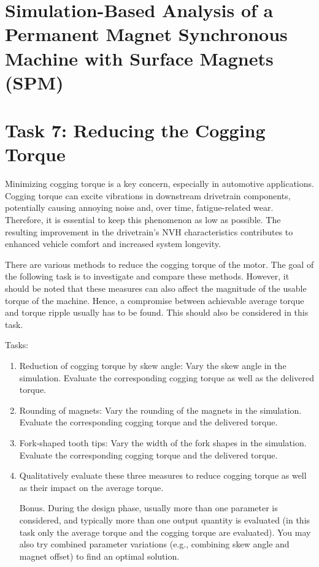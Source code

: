 %
%

\chapter*{Simulation-Based Analysis of a Permanent Magnet Synchronous Machine with Surface Magnets (SPM)}

\chapter{Task 7: Reducing the Cogging Torque}

Minimizing cogging torque is a key concern, especially in automotive applications. Cogging torque can excite vibrations in downstream drivetrain components, potentially causing annoying noise and, over time, fatigue-related wear. Therefore, it is essential to keep this phenomenon as low as possible. The resulting improvement in the drivetrain’s \gls{NVH} characteristics contributes to enhanced vehicle comfort and increased system longevity.

There are various methods to reduce the cogging torque of the motor. The goal of the following task is to investigate and compare these methods. However, it should be noted that these measures can also affect the magnitude of the usable torque of the machine. Hence, a compromise between achievable average torque and torque ripple usually has to be found. This should also be considered in this task.

\bigskip

Tasks:
\begin{enumerate}
	\item Reduction of cogging torque by skew angle: Vary the skew angle in the simulation. Evaluate the corresponding cogging torque as well as the delivered torque.
	\item Rounding of magnets: Vary the rounding of the magnets in the simulation. Evaluate the corresponding cogging torque and the delivered torque.
	\item Fork-shaped tooth tips: Vary the width of the fork shapes in the simulation. Evaluate the corresponding cogging torque and the delivered torque.
	\item Qualitatively evaluate these three measures to reduce cogging torque as well as their impact on the average torque.
	\item [Bonus.] During the design phase, usually more than one parameter is considered, and typically more than one output quantity is evaluated (in this task only the average torque and the cogging torque are evaluated). You may also try combined parameter variations (e.g., combining skew angle and magnet offset) to find an optimal solution.
\end{enumerate}

